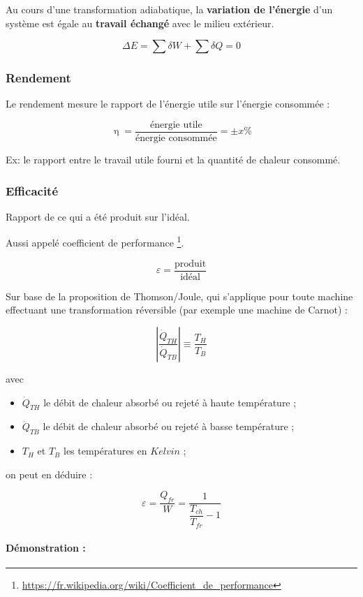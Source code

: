\documentclass[]{article}
\let\oldparagraph\paragraph
\renewcommand{\paragraph}[1]{\oldparagraph{#1}\mbox{}}
\begin{document}
Au cours d’une transformation adiabatique, la \textbf{variation de l’énergie} d’un système est égale au \textbf{travail échangé} avec le milieu extérieur.

$$ \Delta E = \sum \delta W + \sum \delta Q = 0 $$


\newpage

\subsubsection{Rendement}

Le rendement mesure le rapport de l’énergie utile sur l’énergie consommée :

$$ \upeta = \dfrac{\textrm{énergie utile}}{\textrm{énergie consommée}} = \pm x \% $$

Ex: le rapport entre le travail utile fourni et la quantité de chaleur consommé.



\subsubsection{Efficacité}

Rapport de ce qui a été produit sur l’idéal.

Aussi appelé coefficient de performance \footnote{\url{https://fr.wikipedia.org/wiki/Coefficient_de_performance}}.

$$ \varepsilon = \dfrac{\textrm{produit}}{\textrm{idéal}} $$

Sur base de la proposition de Thomson/Joule, qui s’applique pour toute machine effectuant une transformation réversible (par exemple une machine de Carnot) :

$$ \left| \dfrac{\dot{Q}_{TH}}{\dot{Q}_{TB}} \right| \equiv \dfrac{T_H}{T_B}$$

avec \begin{itemize}
	\item 
		$\dot{Q}_{TH}$ le débit de chaleur absorbé ou rejeté à haute température ;
	\item
		$\dot{Q}_{TB}$ le débit de chaleur absorbé ou rejeté à basse température ;
	\item
		$T_H$ et $T_B$ les températures en $Kelvin$ ;
\end{itemize}

 on peut en déduire  :
 
 $$ \varepsilon 
 = \dfrac{Q_{fr}}{W}
 = \dfrac{1}{\dfrac{T_{ch}}{T_{fr}} - 1} $$
 
\paragraph{Démonstration :}
\end{document}
